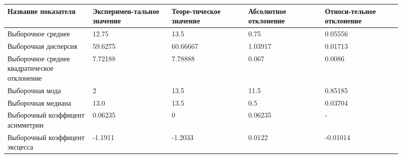 \begin{center}
\begin{tabular}{|p{0.2\linewidth}|p{0.18\linewidth}|p{0.18\linewidth}|p{0.18\linewidth}|p{0.18\linewidth}|}\hline
Название показателя & Эксперимен{-}тальное значение & Теоре{-}тическое значение & Абсолютное отклонение & Относи{-}тельное отклонение\\\hline
Выборочное среднее & 12.75 & 13.5 & 0.75 & 0.05556 \\\hline
Выборочная дисперсия & 59.6275 & 60.66667 & 1.03917 & 0.01713 \\\hline
Выборочное среднее\newline
квадратическое отклонение & 7.72188 & 7.78888 & 0.067 & 0.0086 \\\hline
Выборочная мода & 2 & 13.5 & 11.5 & 0.85185 \\\hline
Выборочная медиана & 13.0 & 13.5 & 0.5 & 0.03704 \\\hline
Выборочный коэффицент асимметрии & 0.06235 & 0 & 0.06235 & - \\\hline
Выборочный коэффицент эксцесса & -1.1911 & -1.2033 & 0.0122 & -0.01014 \\\hline
\end{tabular}
\end{center}
